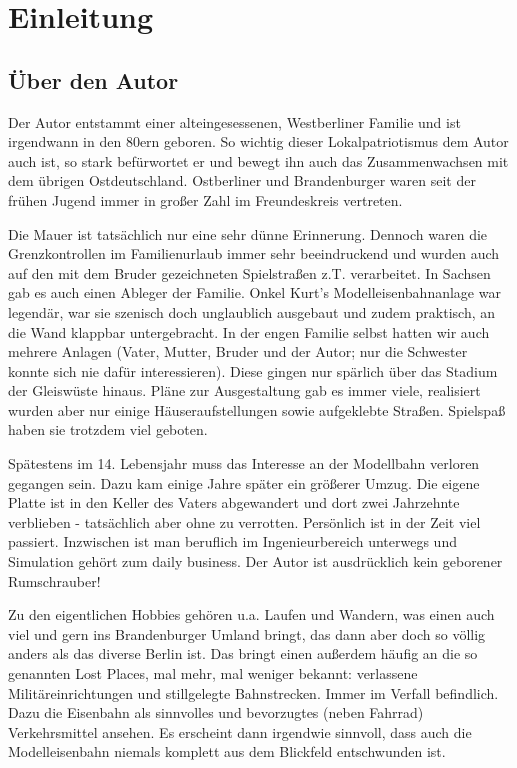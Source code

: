 \section{Einleitung}
\label{sec:introduction}

\subsection{\"Uber den Autor}
\label{sec:author}

Der Autor entstammt einer alteingesessenen, Westberliner Familie und ist irgendwann in den 80ern geboren.
So wichtig dieser Lokalpatriotismus dem Autor auch ist, so stark bef\"urwortet er und bewegt ihn auch das Zusammenwachsen mit dem \"ubrigen Ostdeutschland.
Ostberliner und Brandenburger waren seit der fr\"uhen Jugend immer in gro{\ss}er Zahl im Freundeskreis vertreten.

Die Mauer ist tats\"achlich nur eine sehr d\"unne Erinnerung.
Dennoch waren die Grenzkontrollen im Familienurlaub immer sehr beeindruckend und wurden auch auf den mit dem Bruder gezeichneten Spielstra{\ss}en z.T. verarbeitet.
In Sachsen gab es auch einen Ableger der Familie.
Onkel Kurt's Modelleisenbahnanlage war legend\"ar, war sie szenisch doch unglaublich ausgebaut und zudem praktisch, an die Wand klappbar untergebracht.
In der engen Familie selbst hatten wir auch mehrere Anlagen (Vater, Mutter, Bruder und der Autor; nur die Schwester konnte sich nie daf\"ur interessieren).
Diese gingen nur sp\"arlich \"uber das Stadium der Gleisw\"uste hinaus.
Pl\"ane zur Ausgestaltung gab es immer viele, realisiert wurden aber nur einige H\"auseraufstellungen sowie aufgeklebte Stra{\ss}en.
Spielspa{\ss} haben sie trotzdem viel geboten.

Sp\"atestens im 14. Lebensjahr muss das Interesse an der Modellbahn verloren gegangen sein.
Dazu kam einige Jahre sp\"ater ein gr\"o{\ss}erer Umzug.
Die eigene Platte ist in den Keller des Vaters abgewandert und dort zwei Jahrzehnte verblieben - tats\"achlich aber ohne zu verrotten.
Pers\"onlich ist in der Zeit viel passiert.
Inzwischen ist man beruflich im Ingenieurbereich unterwegs und Simulation geh\"ort zum daily business.
Der Autor ist ausdr\"ucklich kein geborener Rumschrauber!

Zu den eigentlichen Hobbies geh\"oren u.a. Laufen und Wandern, was einen auch viel und gern ins Brandenburger Umland bringt, das dann aber doch so v\"ollig anders als das diverse Berlin ist.
Das bringt einen au{\ss}erdem h\"aufig an die so genannten Lost Places, mal mehr, mal weniger bekannt:
verlassene Milit\"areinrichtungen und stillgelegte Bahnstrecken.
Immer im Verfall befindlich.
Dazu die Eisenbahn als sinnvolles und bevorzugtes (neben Fahrrad) Verkehrsmittel ansehen.
Es erscheint dann irgendwie sinnvoll, dass auch die Modelleisenbahn niemals komplett aus dem Blickfeld entschwunden ist.

